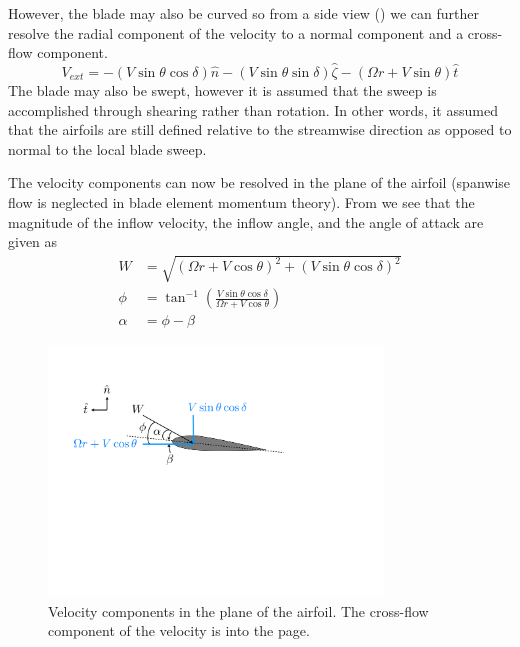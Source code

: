 \documentclass{article}
\begin{document}
However, the blade may also be curved so from a side view () we can further resolve the radial component of the velocity to a normal component and a cross-flow component.
\begin{equation}
    V_{ext} = -(V\sin\theta\cos\delta) \hat{n} - (V\sin\theta\sin\delta) \hat{\zeta} - (\Omega r + V\sin\theta) \hat{t}
\end{equation}
The blade may also be swept, however it is assumed that the sweep is accomplished through shearing rather than rotation. In other words, it assumed that the airfoils are still defined relative to the streamwise direction as opposed to normal to the local blade sweep.


The velocity components can now be resolved in the plane of the airfoil (spanwise flow is neglected in blade element momentum theory).  From  we see that the magnitude of the inflow velocity, the inflow angle, and the angle of attack are given as
\begin{equation}
\begin{aligned}
W &= \sqrt{(\Omega r + V \cos\theta)^2 + (V\sin\theta\cos\delta)^2}\\
\phi &= \tan^{-1}\left( \frac{V \sin\theta \cos\delta}{\Omega r + V \cos\theta}\right) \\
\alpha &= \phi - \beta
\label{eq:alpha}
\end{aligned}
\end{equation}


\begin{figure}[htbp]
\begin{center}
\includegraphics[width=3.5in]{images/Vairfoil}
\caption{Velocity components in the plane of the airfoil.  The cross-flow component of the velocity is into the page.}
\label{fig:Vairfoil}
\end{center}
\end{figure}
\end{document}
